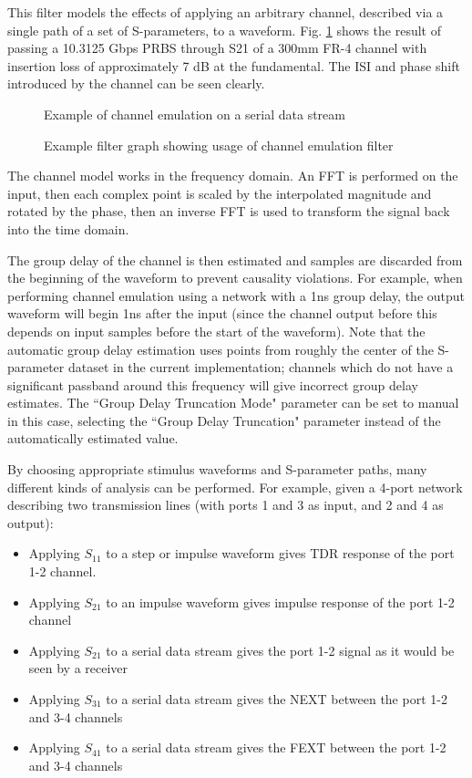 This filter models the effects of applying an arbitrary channel, described via a single path of a set of S-parameters,
to a waveform. Fig. \ref{filter_channelemu} shows the result of passing a 10.3125 Gbps PRBS through S21 of a 300mm FR-4
channel with insertion loss of approximately 7 dB at the fundamental. The ISI and phase shift introduced by the channel
can be seen clearly.

\begin{figure}[h]
\centering
{}
\caption{Example of channel emulation on a serial data stream}
\label{filter_channelemu}
\end{figure}

\begin{figure}[h]
\centering
{}
\caption{Example filter graph showing usage of channel emulation filter}
\label{filter_graph_channelemu}
\end{figure}

The channel model works in the frequency domain. An FFT is performed on the input, then each complex point is scaled by
the interpolated magnitude and rotated by the phase, then an inverse FFT is used to transform the signal back into the
time domain.

The group delay of the channel is then estimated and samples are discarded from the beginning of the waveform to
prevent causality violations. For example, when performing channel emulation using a network with a 1ns group delay,
the output waveform will begin 1ns after the input (since the channel output before this depends on input samples
before the start of the waveform). Note that the automatic group delay estimation uses points from roughly the center
of the S-parameter dataset in the current implementation; channels which do not have a significant passband around this
frequency will give incorrect group delay estimates. The ``Group Delay Truncation Mode" parameter can be set to manual
in this case, selecting the ``Group Delay Truncation" parameter instead of the automatically estimated value.

By choosing appropriate stimulus waveforms and S-parameter paths, many different kinds of analysis can be performed.
For example, given a 4-port network describing two transmission lines (with ports 1 and 3 as input, and 2 and 4 as
output):
\begin{itemize}
\item Applying $S_{11}$ to a step or impulse waveform gives TDR response of the port 1-2 channel.
\item Applying $S_{21}$ to an impulse waveform gives impulse response of the port 1-2 channel
\item Applying $S_{21}$ to a serial data stream gives the port 1-2 signal as it would be seen by a receiver
\item Applying $S_{31}$ to a serial data stream gives the NEXT between the port 1-2 and 3-4 channels
\item Applying $S_{41}$ to a serial data stream gives the FEXT between the port 1-2 and 3-4 channels
\end{itemize}

